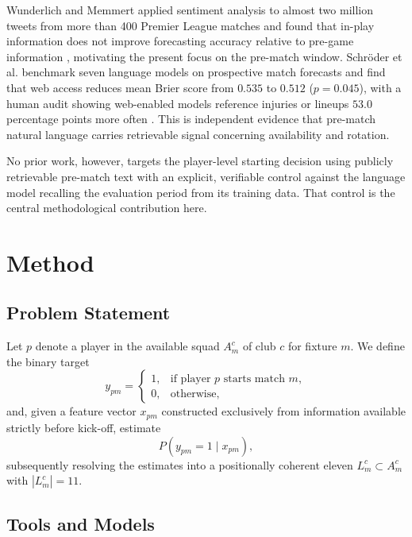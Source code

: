 \documentclass[conference]{IEEEtran}
\begin{document}
Wunderlich and Memmert applied sentiment analysis to almost two million tweets from more than 400 Premier League matches and found that in-play information does not improve forecasting accuracy relative to pre-game information \cite{wunderlichmemmert2022}, motivating the present focus on the pre-match window. Schr\"oder et al. benchmark seven language models on prospective match forecasts and find that web access reduces mean Brier score from $0.535$ to $0.512$ ($p = 0.045$), with a human audit showing web-enabled models reference injuries or lineups $53.0$ percentage points more often \cite{schroeder2026}. This is independent evidence that pre-match natural language carries retrievable signal concerning availability and rotation.

No prior work, however, targets the player-level starting decision using publicly retrievable pre-match text with an explicit, verifiable control against the language model recalling the evaluation period from its training data. That control is the central methodological contribution here.

\section{Method}

\subsection{Problem Statement}

Let $p$ denote a player in the available squad $A^{c}_{m}$ of club $c$ for fixture $m$. We define the binary target
\begin{equation}
y_{pm} =
\begin{cases}
1, & \text{if player } p \text{ starts match } m, \\
0, & \text{otherwise,}
\end{cases}
\label{eq:target}
\end{equation}
and, given a feature vector $x_{pm}$ constructed exclusively from information available strictly before kick-off, estimate
\begin{equation}
P\left(y_{pm} = 1 \mid x_{pm}\right),
\label{eq:posterior}
\end{equation}
subsequently resolving the estimates into a positionally coherent eleven $L^{c}_{m} \subset A^{c}_{m}$ with $|L^{c}_{m}| = 11$.

\subsection{Tools and Models}
\end{document}
